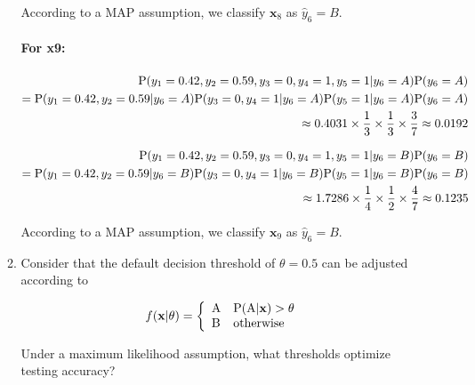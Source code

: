 \documentclass[12pt]{article}
\begin{document}
\begin{enumerate}[leftmargin=\labelsep]
\begin{enumerate}
        According to a MAP assumption, we classify $\mathbf{x}_8$ as $\hat{y}_6 = B$.

        \paragraph{For x9:}

        \begin{equation}
        \begin{split}
            \textrm{P}(y_1 = 0.42, y_2 = 0.59, y_3 = 0, y_4 = 1, y_5 = 1|y_6 = A)\textrm{P}(y_6 = A)\\
            = \textrm{P}(y_1 = 0.42, y_2 = 0.59|y_6 = A)\textrm{P}(y_3 = 0, y_4 = 1|y_6 = A)\textrm{P}(y_5 = 1|y_6 = A)\textrm{P}(y_6 = A)\\
            \approx 0.4031 \times \frac{1}{3} \times \frac{1}{3} \times \frac{3}{7} \approx 0.0192
        \end{split}
        \end{equation}

        \begin{equation}
        \begin{split}
            \textrm{P}(y_1 = 0.42, y_2 = 0.59, y_3 = 0, y_4 = 1, y_5 = 1|y_6 = B)\textrm{P}(y_6 = B)\\
            = \textrm{P}(y_1 = 0.42, y_2 = 0.59|y_6 = B)\textrm{P}(y_3 = 0, y_4 = 1|y_6 = B)\textrm{P}(y_5 = 1|y_6 = B)\textrm{P}(y_6 = B)\\
            \approx 1.7286 \times \frac{1}{4} \times \frac{1}{2} \times \frac{4}{7} \approx 0.1235
        \end{split}
        \end{equation}

        According to a MAP assumption, we classify $\mathbf{x}_9$ as $\hat{y}_6 = B$.

        \item  Consider that the default decision threshold of $\theta = 0.5$ can be adjusted according to
    
            \[ 
            f(\mathbf{x}|\theta)= \left\{
            \begin{array}{ll}
                  \textrm{A} & \textrm{P}(\textrm{A}|\mathbf{x}) > \theta \\
                  \textrm{B} & \textrm{otherwise}
            \end{array} 
            \right. 
            \]

            Under a maximum likelihood assumption, what thresholds optimize testing accuracy?


\end{enumerate}
\end{enumerate}
\end{document}
